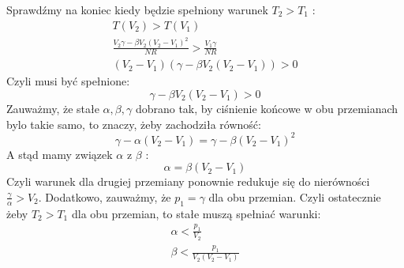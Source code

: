 \documentclass[12pt,a4paper]{article}
\begin{document}
Sprawdźmy na koniec kiedy będzie spełniony warunek $T_{2}>T_{1}$ :
$$
\begin{gathered}
T\left(V_{2}\right)>T\left(V_{1}\right) \\
\frac{V_{2} \gamma-\beta V_{2}\left(V_{2}-V_{1}\right)^{2}}{N R}>\frac{V_{1} \gamma}{N R} \\
\left(V_{2}-V_{1}\right)\left(\gamma-\beta V_{2}\left(V_{2}-V_{1}\right)\right)>0
\end{gathered}
$$
Czyli musi być spełnione:
$$
\gamma-\beta V_{2}\left(V_{2}-V_{1}\right)>0
$$
Zauważmy, że stałe $\alpha, \beta, \gamma$ dobrano tak, by ciśnienie końcowe w obu przemianach bylo takie samo, to znaczy, żeby zachodziła równość:
$$
\gamma-\alpha\left(V_{2}-V_{1}\right)=\gamma-\beta\left(V_{2}-V_{1}\right)^{2}
$$
A stąd mamy związek $\alpha$ z $\beta$ :
$$
\alpha=\beta\left(V_{2}-V_{1}\right)
$$
Czyli warunek dla drugiej przemiany ponownie redukuje się do nierówności $\frac{\gamma}{\alpha}>V_{2}$. Dodatkowo, zauważmy, że $p_{1}=\gamma$ dla obu przemian. Czyli ostatecznie żeby $T_{2}>T_{1}$ dla obu przemian, to stałe muszą spełniać warunki:
$$
\begin{gathered}
\alpha<\frac{p_{1}}{V_{2}} \\
\beta<\frac{p_{1}}{V_{2}\left(V_{2}-V_{1}\right)}
\end{gathered}
$$
\end{document}
